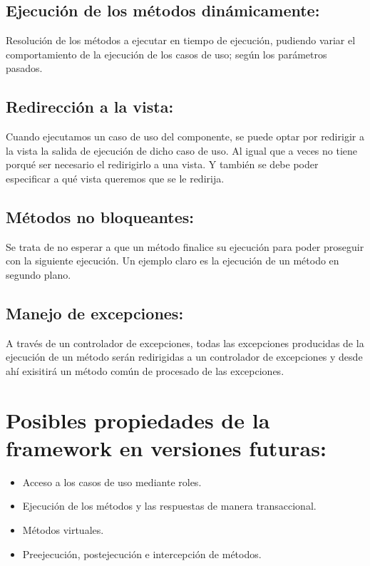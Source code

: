 \documentclass{article}
\begin{document}
\subsection{Ejecución de los métodos dinámicamente:}
Resolución de los métodos a ejecutar en tiempo de ejecución, pudiendo variar el
comportamiento de la ejecución de los casos de uso; según los parámetros
pasados.
\subsection{Redirección a la vista:}
Cuando ejecutamos un caso de uso del componente, se puede optar por redirigir a
la vista la salida de ejecución de dicho caso de uso.  Al igual que a veces no
tiene porqué ser necesario el redirigirlo a una vista.  Y también se debe poder
especificar a qué vista queremos que se le redirija.
\subsection{Métodos no bloqueantes:}
Se trata de no esperar a que un método finalice su ejecución para poder
proseguir con la siguiente ejecución.  Un ejemplo claro es la ejecución de un
método en segundo plano.
\subsection{Manejo de excepciones:}
A través de un controlador de excepciones, todas las excepciones producidas de
la ejecución de un método serán redirigidas a un controlador de excepciones y
desde ahí exisitirá un método común de procesado de las excepciones.
\section{Posibles propiedades de la framework en versiones futuras:}
\begin{itemize}
\item Acceso a los casos de uso mediante roles.
\item Ejecución de los métodos y las respuestas de manera transaccional.
\item Métodos virtuales.
\item Preejecución, postejecución e intercepción de métodos.
\end{itemize}
\end{document}
